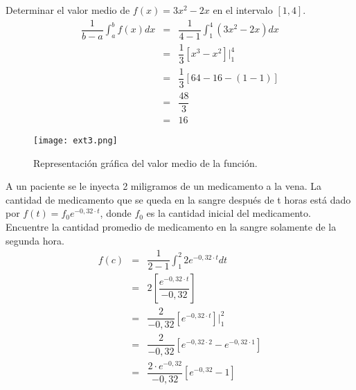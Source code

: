 \begin{myexample}
Determinar el valor medio de $f(x)=3x^{2}-2x$ en el intervalo $[1,4]$.
\begin{eqnarray*}
\dfrac{1}{b-a}\int_{a}^{b}f(x)dx&=&\dfrac{1}{4-1}\int_{1}^{4}(3x^{2}-2x)dx \\
&=& \dfrac{1}{3}\left[x^{3}-x^{2} \right]\Bigg|_{1}^{4}\\
&=&\dfrac{1}{3}\left[64-16-(1-1) \right]\\
&=&\dfrac{48}{3}\\
&=&16
\end{eqnarray*}
\begin{center}
\begin{figure}[h!]
\centering
\texttt{[image: ext3.png]}
\caption{Representación gráfica del valor medio de la función.} \label{ext3}
\end{figure}
\end{center}
\end{myexample}

\begin{myexample}
 A un paciente se le inyecta 2 miligramos de un medicamento a la vena. La cantidad de medicamento que se queda en la sangre después de t horas está dado por $f(t)=f_{0}e^{-0,32\cdot t}$, donde $f_{0}$ es la cantidad inicial del medicamento. Encuentre la cantidad promedio de medicamento en la sangre solamente de la segunda hora.\\

\begin{eqnarray*}
f(c)&=&\dfrac{1}{2-1}\int_{1}^{2}2e^{-0,32\cdot t}dt\\
&=& 2\left[\dfrac{e^{-0,32\cdot t}}{-0,32} \right]\\
&=& \dfrac{2}{-0,32}\left[e^{-0,32\cdot t}\right]\Bigg|_{1}^{2}\\
&=& \dfrac{2}{-0,32}\left[e^{-0,32\cdot 2}-e^{-0,32\cdot 1}\right]\\
&=& \dfrac{2\cdot e^{-0,32}}{-0,32}\left[e^{-0,32}-1\right]\\
\end{eqnarray*}
 \end{myexample}
